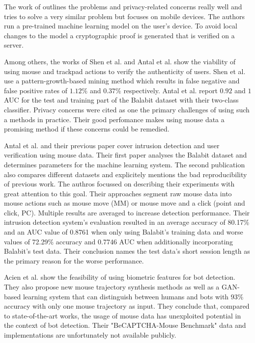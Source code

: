 \documentclass[
    fontsize=12pt,
    headings=small,
    parskip=half,           %
    bibliography=totoc,
    numbers=noenddot,       %
    open=any,               %
    final                   %
]{scrreprt}
\begin{document}
The work of \cite{PETS2021} outlines the problems and privacy-related concerns really well and tries to solve a very similar problem but focuses on mobile devices. The authors run a pre-trained machine learning model on the user's device. To avoid local changes to the model a cryptographic proof is generated that is verified on a server.

Among others, the works of Shen et al. \cite{6263955} and Antal et al. \cite{9111596} show the viability of using mouse and trackpad actions to verify the authenticity of users.
Shen et al. use a pattern-growth-based mining method which results in false negative and false positive rates of $1.12\%$ and $0.37\%$ respectively.
Antal et al. report $0.92$ and $1$ AUC for the test and training part of the Balabit dataset \cite{BALABIT_CHALLENGE} with their two-class classifier.
Privacy concerns were cited as one the primary challenges of using such a methods in practice. Their good perfomance makes using mouse data a promising method if these concerns could be remedied.

Antal et al.\cite{9111596} and their previous paper\cite{https://doi.org/10.1049/iet-bmt.2018.5126} cover intrusion detection and user verification using mouse data. Their first paper analyses the Balabit dataset and determines parameters for the machine learning system. The second publication also compares different datasets and explicitely mentions the bad reproducibility of previous work. The authros focussed on describing their experiments with great attention to this goal. Their approaches segment raw mouse data into mouse actions such as mouse move (MM) or mouse move and a click (point and click, PC). Multiple results are averaged to increase detection performance. Their intrusion detection system's evaluation resulted in an average accuracy of 80.17\% and an AUC value of 0.8761 when only using Balabit's training data and worse values of 72.29\% accuracy and 0.7746 AUC when additionally incorporating Balabit's test data. Their conclusion names the test data's short session length as the primary reason for the worse performance.

Acien et al. \cite{Acien2020BeCAPTCHAMouseSM} show the feasibility of using biometric features for bot detection. They also propose new mouse trajectory synthesis methods as well as a GAN-based learning system that can distinguish between humans and bots with $93\%$ accuracy with only one mouse trajectory as input. They conclude that, compared to state-of-the-art works, the usage of mouse data has unexploited potential in the context of bot detection. Their "BeCAPTCHA-Mouse Benchmark" data and implementations are unfortunately not available publicly.
\end{document}

